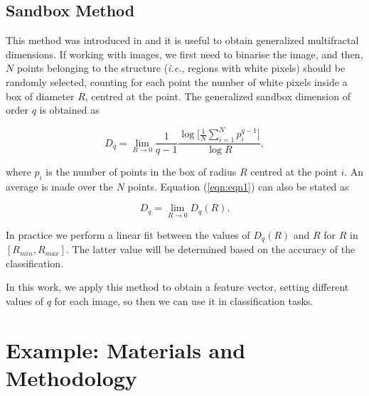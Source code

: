 \documentclass[oneside,a4paper,english,links]{article}
\begin{document}
\subsection{Sandbox Method}
This method was introduced in \cite{Tel89} and it is useful to obtain generalized multifractal dimensions. If working with images, we first need to binarise the image, and then, $N$ points belonging to the structure ({\em i.e.}, regions with white pixels) should be randomly selected, counting for each point the number of white pixels inside a box of diameter $R$, centred at the point. The generalized sandbox dimension of order $q$ is obtained as \cite{Bert94}

\begin{equation}
D_{q} = \lim_{R\rightarrow0}{\frac{1}{q-1} \frac{\log \bigg \lbrack\frac{1}{N}\displaystyle \sum_{i=1}^{N}{p_{i}^{q-1}}\bigg \rbrack}{\log R}},
\label{eqn:eqn1}
\end{equation}

where $p_{i}$ is the number of points in the box of radius $R$ centred at the point $i$. An average is made over the $N$ points. Equation (\ref{eqn:eqn1}) can also be stated as

\begin{equation}
D_{q} = \lim_{R\rightarrow0}{D_{q}(R)}.
\end{equation}

In practice we perform a linear fit between the values of $D_{q}(R)$ and $R$ for $R$ in $[R_{min}, R_{max}]$. The latter value will be determined based on the accuracy of the classification.

In this work, we apply this method to obtain a feature vector, setting different values of $q$ for each image, so then we can use it in classification tasks.

\section{Example: Materials and Methodology}
\end{document}

